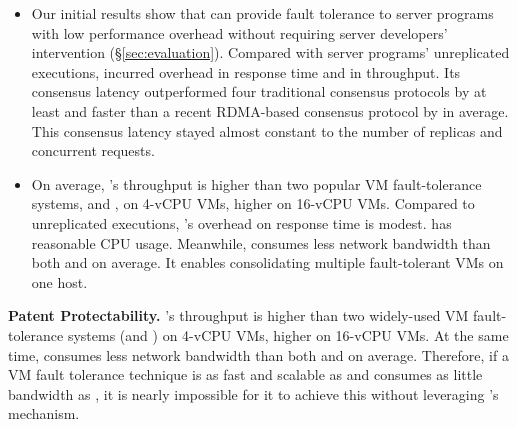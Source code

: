 \begin{itemize}
\item Our initial results show that \xxx can provide fault 
tolerance to server programs with low performance overhead without requiring 
server developers' intervention (\S\ref{sec:evaluation}). Compared with \nprog 
server programs' unreplicated executions, \xxx incurred \latencyoverhead 
overhead in response time and \tputoverhead in throughput. Its consensus 
latency outperformed four traditional consensus protocols by at least 
\comptradlow and faster than a recent RDMA-based consensus protocol \dare by 
\fasterDARE in average. This consensus latency stayed almost constant to the 
number of replicas and concurrent requests.
\item On average, \yyy's throughput is \avgtput higher than two popular VM 
fault-tolerance systems, \qemumc and \colo, on 4-vCPU VMs, \avgsixteen higher 
on 16-vCPU VMs. Compared to unreplicated executions, \xxx's overhead on 
response time is modest. \xxx has reasonable CPU usage. Meanwhile, \yyy 
consumes \avgbandwidth less network bandwidth than both \qemumc and \colo on 
average. It enables consolidating multiple fault-tolerant VMs on one host.
\end{itemize}

\noindent
\textbf{Patent Protectability.} \yyy's throughput is \avgtput higher 
than two widely-used VM fault-tolerance systems (\qemumc and \colo) on 4-vCPU 
VMs, \avgsixteen higher on 16-vCPU VMs. At the same time, \yyy consumes 
\avgbandwidth less network bandwidth than both \qemumc and \colo on average. 
Therefore, if a VM fault tolerance technique is as fast and scalable as \yyy and 
consumes as little bandwidth as \yyy, it is nearly impossible for it to achieve 
this without leveraging \yyy's mechanism.

